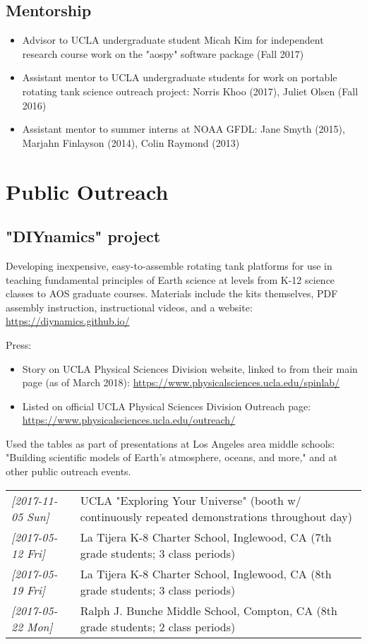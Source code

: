 \documentclass[12pt,letterpaper]{shillcv}
\begin{document}
\subsection*{Mentorship}
\label{sec:org2f592ed}
\begin{itemize}
\item Advisor to UCLA undergraduate student Micah Kim for independent research
course work on the "aospy" software package (Fall 2017)
\item Assistant mentor to UCLA undergraduate students for work on portable rotating
tank science outreach project: Norris Khoo (2017), Juliet Olsen (Fall 2016)
\item Assistant mentor to summer interns at NOAA GFDL: Jane Smyth (2015), Marjahn
Finlayson (2014), Colin Raymond (2013)
\end{itemize}
\section*{Public Outreach}
\label{sec:org62e4199}
\subsection*{"DIYnamics" project}
\label{sec:org5013dde}
Developing inexpensive, easy-to-assemble rotating tank platforms for use in
teaching fundamental principles of Earth science at levels from K-12 science
classes to AOS graduate courses.  Materials include the kits themselves, PDF
assembly instruction, instructional videos, and a website:
\url{https://diynamics.github.io/}

Press:

\begin{itemize}
\item Story on UCLA Physical Sciences Division website, linked to from their main
page (as of March 2018): \url{https://www.physicalsciences.ucla.edu/spinlab/}
\item Listed on official UCLA Physical Sciences Division Outreach page:
\url{https://www.physicalsciences.ucla.edu/outreach/}
\end{itemize}

Used the tables as part of presentations at Los Angeles area middle schools:
"Building scientific models of Earth's atmosphere, oceans, and more," and at
other public outreach events.
\begin{center}
\begin{tabular}{ll}
\textit{[2017-11-05 Sun]} & UCLA "Exploring Your Universe" (booth w/ continuously repeated demonstrations throughout day)\\
\textit{[2017-05-12 Fri]} & La Tijera K-8 Charter School, Inglewood, CA (7th grade students; 3 class periods)\\
\textit{[2017-05-19 Fri]} & La Tijera K-8 Charter School, Inglewood, CA (8th grade students; 3 class periods)\\
\textit{[2017-05-22 Mon]} & Ralph J. Bunche Middle School, Compton, CA (8th grade students; 2 class periods)\\
\end{tabular}
\end{center}
\end{document}
